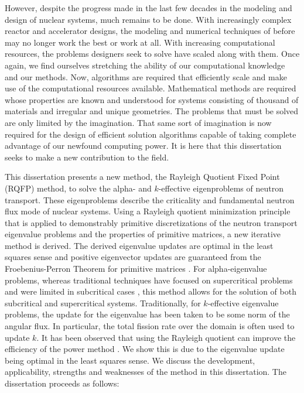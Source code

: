 However, despite the progress made in the last few decades in the modeling and design of nuclear systems, much remains to be done. With increasingly complex reactor and accelerator designs, the modeling and numerical techniques of before may no longer work the best or work at all. With increasing computational resources, the problems designers seek to solve have scaled along with them. Once again, we find ourselves stretching the ability of our computational knowledge and our methods. Now, algorithms are required that efficiently scale and make use of the computational resources available. Mathematical methods are required whose properties are known and understood for systems consisting of thousand of materials and irregular and unique geometries. The problems that must be solved are only limited by the imagination. That same sort of imagination is now required for the design of efficient solution algorithms capable of taking complete advantage of our newfound computing power. It is here that this dissertation seeks to make a new contribution to the field. 

This dissertation presents a new method, the Rayleigh Quotient Fixed Point (RQFP) method, to solve the alpha- and $k$-effective eigenproblems of neutron transport. These eigenproblems describe the criticality and fundamental neutron flux mode of nuclear systems. Using a Rayleigh quotient minimization principle that is applied to demonstrably primitive discretizations of the neutron transport eigenvalue problems and the properties of primitive matrices, a new iterative method is derived. The derived eigenvalue updates are optimal in the least squares sense and positive eigenvector updates are guaranteed from the Froebenius-Perron Theorem for primitive matrices \cite{birkhoff_reactor_1958} \cite{birkhoff_positivity_1961}. For alpha-eigenvalue problems, whereas traditional techniques have focused on supercritical problems and were limited in subcritical cases \cite{hill_efficient_1983}, this method allows for the solution of both subcritical and supercritical systems. Traditionally, for $k$-effective eigenvalue problems, the update for the eigenvalue has been taken to be some norm of the angular flux. In particular, the total fission rate over the domain is often used to update $k$. It has been observed that using the Rayleigh quotient can improve the efficiency of the power method \cite{warsa2004krylov}. We show this is due to the eigenvalue update being optimal in the least squares sense. 
We discuss the development, applicability, strengths and weaknesses of the method in this dissertation. The dissertation proceeds as follows:

